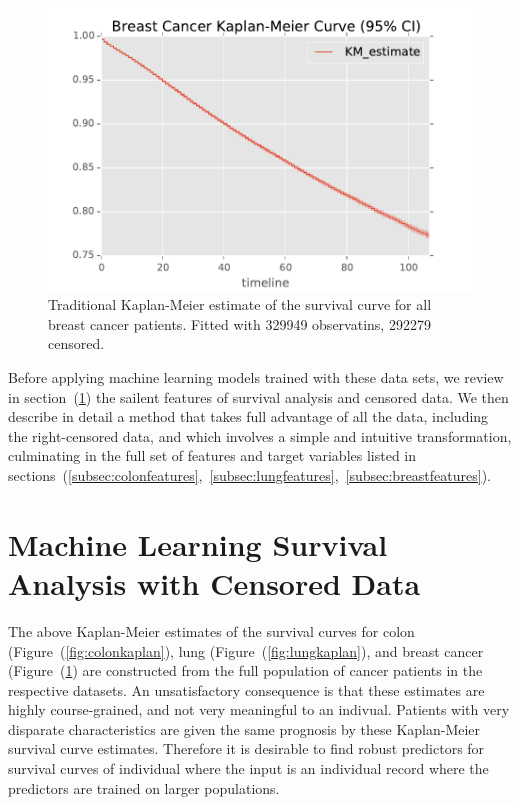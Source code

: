 \documentclass[a4paper,11pt]{article}
\begin{document}
\begin{figure}[tbp]
\centering 
\begin{center}
\includegraphics[width=.90\textwidth,origin=c]{breastkaplan.pdf}
\caption{\label{fig:breastkaplan} Traditional Kaplan-Meier estimate of the survival curve for all breast cancer patients. Fitted with 329949 observatins, 292279 censored.}
\end{center}
\end{figure}


Before applying machine learning models trained with these data sets, we review in section~(\ref{sec:surv}) the sailent features of survival analysis and censored data. We then describe in detail a method that takes full advantage of all the data, including the right-censored data, and which involves a simple and intuitive transformation, culminating in the full set of features and target variables listed in sections~(\ref{subsec:colonfeatures},~\ref{subsec:lungfeatures},~\ref{subsec:breastfeatures}).

\section{Machine Learning Survival Analysis with Censored Data}
\label{sec:surv}


The above Kaplan-Meier estimates of the survival curves for colon (Figure~(\ref{fig:colonkaplan}), lung 
(Figure~(\ref{fig:lungkaplan}), and breast cancer (Figure~(\ref{fig:breastkaplan}) are constructed from the full population of cancer patients in the respective datasets.
An unsatisfactory consequence is that these estimates are highly course-grained, and not very meaningful to an indivual. Patients with very disparate characteristics are given the same prognosis by these Kaplan-Meier survival curve estimates. Therefore it is desirable to find robust predictors for survival curves of individual where the input is an individual record where the predictors are trained on larger populations.
\end{document}
